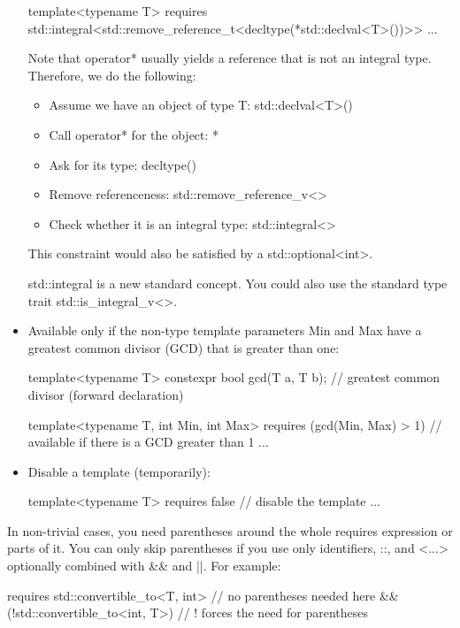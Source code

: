 \begin{itemize}
\begin{cpp}
template<typename T>
requires std::integral<std::remove_reference_t<decltype(*std::declval<T>())>>
...
\end{cpp}

Note that operator* usually yields a reference that is not an integral type. Therefore, we do the following:

\begin{itemize}
\item
Assume we have an object of type T: std::declval<T>()

\item
Call operator* for the object: *

\item
Ask for its type: decltype()

\item
Remove referenceness: std::remove\_reference\_v<>

\item
Check whether it is an integral type: std::integral<>
\end{itemize}

This constraint would also be satisfied by a std::optional<int>.

std::integral is a new standard concept. You could also use the standard type trait std::is\_integral\_v<>.

\item
Available only if the non-type template parameters Min and Max have a greatest common divisor (GCD) that is greater than one:

\begin{cpp}
template<typename T>
constexpr bool gcd(T a, T b); // greatest common divisor (forward declaration)

template<typename T, int Min, int Max>
requires (gcd(Min, Max) > 1) // available if there is a GCD greater than 1
...
\end{cpp}

\item
Disable a template (temporarily):

\begin{cpp}
template<typename T>
requires false // disable the template
...
\end{cpp}
\end{itemize}

In non-trivial cases, you need parentheses around the whole requires expression or parts of it. You can only skip parentheses if you use only identifiers, ::, and <...> optionally combined with \&\& and ||. For example:

\begin{cpp}
requires std::convertible_to<T, int> // no parentheses needed here
		&&
		(!std::convertible_to<int, T>) // ! forces the need for parentheses
\end{cpp}


























